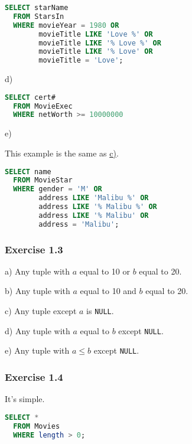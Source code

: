 \documentclass[../../main.tex]{subfiles}
\begin{document}
\begin{lstlisting}[language=sql]
  SELECT starName
  FROM StarsIn
  WHERE movieYear = 1980 OR
        movieTitle LIKE 'Love %' OR
        movieTitle LIKE '% Love %' OR
        movieTitle LIKE '% Love' OR
        movieTitle = 'Love';
\end{lstlisting}

d)

\begin{lstlisting}[language=sql]
  SELECT cert#
  FROM MovieExec
  WHERE netWorth >= 10000000
\end{lstlisting}

e)

This example is the same as \hyperlink{Solution6.1.2c}{c)}.

\begin{lstlisting}[language=sql]
  SELECT name
  FROM MovieStar
  WHERE gender = 'M' OR
        address LIKE 'Malibu %' OR
        address LIKE '% Malibu %' OR
        address LIKE '% Malibu' OR
        address = 'Malibu';
\end{lstlisting}

\subsubsection*{Exercise 1.3}

a) Any tuple with $a$ equal to 10 or $b$ equal to 20.

b) Any tuple with $a$ equal to 10 and $b$ equal to 20.

c) Any tuple except $a$ is \verb|NULL|.

d) Any tuple with $a$ equal to $b$ except \verb|NULL|.

e) Any tuple with $a \leq b$ except \verb|NULL|.

\subsubsection*{Exercise 1.4}

It's simple.

\begin{lstlisting}[language=sql]
  SELECT *
  FROM Movies
  WHERE length > 0;
\end{lstlisting}
\end{document}
